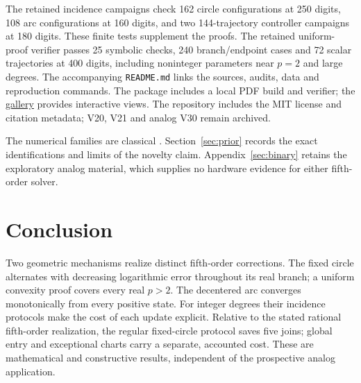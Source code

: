 \documentclass[11pt,a4paper]{article}
\begin{document}
The retained incidence campaigns check 162 circle configurations at 250 digits, 108 arc configurations at 160 digits, and two 144-trajectory controller campaigns at 180 digits. These finite tests supplement the proofs. The retained uniform-proof verifier passes 25 symbolic checks, 240 branch/endpoint cases and 72 scalar trajectories at 400 digits, including noninteger parameters near $p=2$ and large degrees. The accompanying \texttt{README.md} links the sources, audits, data and reproduction commands. The package includes a local PDF build and verifier; the \href{https://ivan-fr.github.io/pandrosion/}{gallery} provides interactive views. The repository includes the MIT license and citation metadata; V20, V21 and analog V30 remain archived.

The numerical families are classical \cite{dlmf38,laszkiewicz2009,baker1996}. Section~\ref{sec:prior} records the exact identifications and limits of the novelty claim. Appendix~\ref{sec:binary} retains the exploratory analog material, which supplies no hardware evidence for either fifth-order solver.

\section{Conclusion}
Two geometric mechanisms realize distinct fifth-order corrections. The fixed circle alternates with decreasing logarithmic error throughout its real branch; a uniform convexity proof covers every real $p>2$. The decentered arc converges monotonically from every positive state. For integer degrees their incidence protocols make the cost of each update explicit. Relative to the stated rational fifth-order realization, the regular fixed-circle protocol saves five joins; global entry and exceptional charts carry a separate, accounted cost. These are mathematical and constructive results, independent of the prospective analog application.

\clearpage
\appendix
\end{document}
